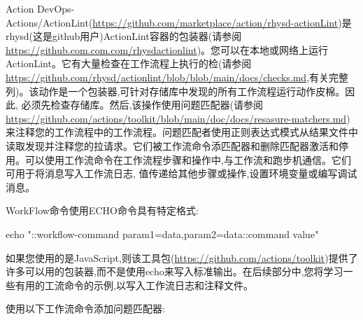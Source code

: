 

Action DevOps-Actions/ActionLint(\url{https://github.com/marketplace/action/rhysd-actionLint})是rhysd(这是github用户)ActionLint容器的包装器(请参阅\url{https://github.com.com.com/rhysdactionlint})。您可以在本地或网络上运行ActionLint。它有大量检查在工作流程上执行的检(请参阅\url{https://github.com/rhysd/actionlint/blob/blob/main/docs/checks.md},有关完整列)。该动作是一个包装器,可针对存储库中发现的所有工作流程运行动作皮棉。因此, 必须先检查存储库。然后,该操作使用问题匹配器(请参阅\url{https://github.com/actions/toolkit/blob/main/doc/docs/resasure-matchers.md})来注释您的工作流程中的工作流程。问题匹配者使用正则表达式模式从结果文件中读取发现并注释您的拉请求。它们被工作流命令添匹配器和删除匹配器激活和停用。可以使用工作流命令在工作流程步骤和操作中,与工作流和跑步机通信。它们可用于将消息写入工作流日志, 值传递给其他步骤或操作,设置环境变量或编写调试消息。

WorkFlow命令使用ECHO命令具有特定格式:

\begin{shell}
  echo "::workflow-command param1={data},param2={data}::{command value}"
\end{shell}

如果您使用的是JavaScript,则该工具包(\url{https://github.com/actions/toolkit})提供了许多可以用的包装器,而不是使用echo来写入标准输出。在后续部分中,您将学习一些有用的工流命令的示例,以写入工作流日志和注释文件。

使用以下工作流命令添加问题匹配器:


